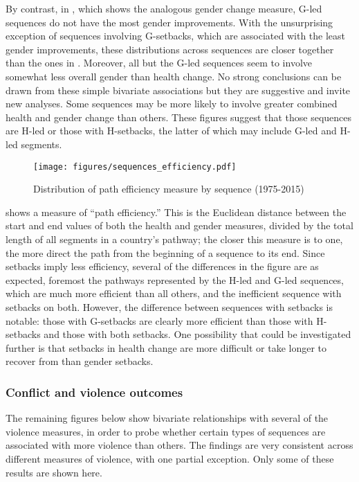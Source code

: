 \documentclass[12pt]{article}
\begin{document}
By contrast, in , which shows the analogous gender change measure, G-led sequences do not have the most gender improvements.
With the unsurprising exception of sequences involving G-setbacks, which are associated with the least gender improvements, these distributions across sequences are closer together than the ones in .
Moreover, all but the G-led sequences seem to involve somewhat less overall gender than health change.
No strong conclusions can be drawn from these simple bivariate associations but they are suggestive and invite new analyses.
Some sequences may be more likely to involve greater combined health and gender change than others.
These figures suggest that those sequences are H-led or those with H-setbacks, the latter of which may include G-led and H-led segments.

\begin{figure}[htbp]
    \centering
    \caption{Distribution of path efficiency measure by sequence (1975-2015)}
    \label{sequences_efficiency}
    \texttt{[image: figures/sequences\_efficiency.pdf]}
\end{figure}

 shows a measure of \enquote{path efficiency.}
This is the Euclidean distance between the start and end values of both the health and gender measures, divided by the total length of all segments in a country's pathway; the closer this measure is to one, the more direct the path from the beginning of a sequence to its end.
Since setbacks imply less efficiency, several of the differences in the figure are as expected, foremost the pathways represented by the H-led and G-led sequences, which are much more efficient than all others, and the inefficient sequence with setbacks on both.
However, the difference between sequences with setbacks is notable: those with G-setbacks are clearly more efficient than those with H-setbacks and those with both setbacks.
One possibility that could be investigated further is that setbacks in health change are more difficult or take longer to recover from than gender setbacks.

\subsubsection{Conflict and violence outcomes}

The remaining figures below show bivariate relationships with several of the violence measures, in order to probe whether certain types of sequences are associated with more violence than others.
The findings are very consistent across different measures of violence, with one partial exception.
Only some of these results are shown here.
\end{document}

